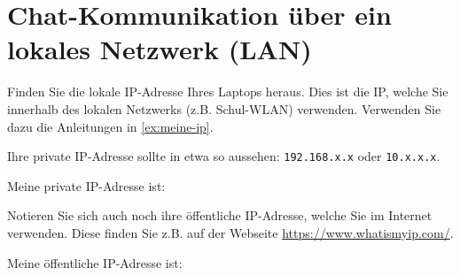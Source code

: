 \section{Chat-Kommunikation über ein lokales Netzwerk (LAN)}




\begin{myexercise}
    Finden Sie die lokale \gls{IP}-Adresse Ihres Laptops heraus. Dies ist die IP, welche Sie innerhalb des lokalen Netzwerks (z.B. Schul-WLAN) verwenden. Verwenden Sie dazu die Anleitungen in \cref{ex:meine-ip}.

    Ihre private \gls{IP}-Adresse sollte in etwa so aussehen: \texttt{192.168.x.x} oder \texttt{10.x.x.x}.

    Meine private \gls{IP}-Adresse ist: \ipPlaceHolder

    Notieren Sie sich auch noch ihre öffentliche \gls{IP}-Adresse, welche Sie im Internet verwenden. Diese finden Sie z.B. auf der Webseite \url{https://www.whatismyip.com/}.

    Meine öffentliche \gls{IP}-Adresse ist: \ipPlaceHolder
\end{myexercise}

